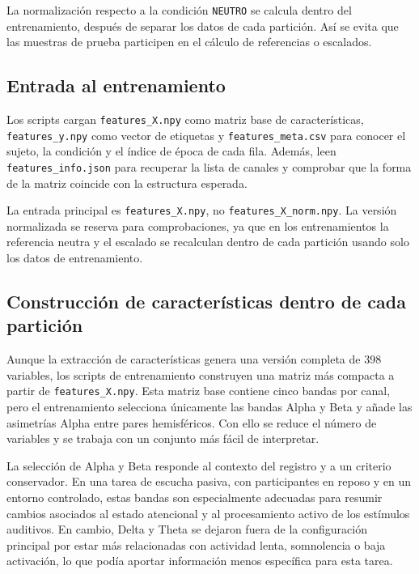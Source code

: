 La normalización respecto a la condición \texttt{NEUTRO} se calcula dentro del entrenamiento, después de separar los datos de cada partición. Así se evita que las muestras de prueba participen en el cálculo de referencias o escalados.

\subsection{Entrada al entrenamiento}

Los scripts cargan \texttt{features\_X.npy} como matriz base de características, \texttt{features\_y.npy} como vector de etiquetas y \texttt{features\_meta.csv} para conocer el sujeto, la condición y el índice de época de cada fila. Además, leen \texttt{features\_info.json} para recuperar la lista de canales y comprobar que la forma de la matriz coincide con la estructura esperada.

La entrada principal es \texttt{features\_X.npy}, no \texttt{features\_X\_norm.npy}. La versión normalizada se reserva para comprobaciones, ya que en los entrenamientos la referencia neutra y el escalado se recalculan dentro de cada partición usando solo los datos de entrenamiento.

\subsection{Construcción de características dentro de cada partición}

Aunque la extracción de características genera una versión completa de 398 variables, los scripts de entrenamiento construyen una matriz más compacta a partir de \texttt{features\_X.npy}. Esta matriz base contiene cinco bandas por canal, pero el entrenamiento selecciona únicamente las bandas Alpha y Beta y añade las asimetrías Alpha entre pares hemisféricos. Con ello se reduce el número de variables y se trabaja con un conjunto más fácil de interpretar.

La selección de Alpha y Beta responde al contexto del registro y a un criterio conservador. En una tarea de escucha pasiva, con participantes en reposo y en un entorno controlado, estas bandas son especialmente adecuadas para resumir cambios asociados al estado atencional y al procesamiento activo de los estímulos auditivos. En cambio, Delta y Theta se dejaron fuera de la configuración principal por estar más relacionadas con actividad lenta, somnolencia o baja activación, lo que podía aportar información menos específica para esta tarea.

